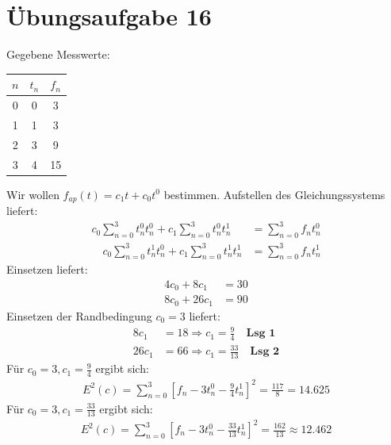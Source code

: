     \section*{Übungsaufgabe 16}
    Gegebene Messwerte: \\
    \begin{center}
    \begin{tabular}{|c|c|c|}
        \hline 
        $n$ & $t_n$ & $f_n$ \\
        \hline
        0   &  0    & 3 \\
        1   &  1    & 3 \\
        2   &  3    & 9 \\
        3   &  4    & 15 \\
        \hline
    \end{tabular}
    \end{center}
    Wir wollen $f_{ap}(t) = c_1 t + c_0 t^0$ bestimmen. Aufstellen des Gleichungssystems liefert:
    \begin{align*}
        c_0 \sum_{n=0}^{3} t_n^0 t_n^0 + c_1 \sum_{n=0}^3 t_n^0 t_n^1 &= \sum_{n=0}^3 f_n t_n^0 \\
        \quad c_0 \sum_{n=0}^{3} t_n^1 t_n^0 + c_1 \sum_{n=0}^3 t_n^1 t_n^1 &= \sum_{n=0}^3 f_n t_n^1
    \end{align*}
    Einsetzen liefert:
    \begin{align*}
        4c_0 + 8c_1 &= 30 \\
        8c_0 + 26c_1 &= 90
    \end{align*}
    Einsetzen der Randbedingung $c_0 = 3$ liefert:
    \begin{align*}
        8c_1 &= 18  \Rightarrow c_1 = \frac{9}{4} \quad \textbf{Lsg 1} \\
        26c_1 &= 66 \Rightarrow c_1 = \frac{33}{13} \quad \textbf{Lsg 2}
    \end{align*}
    Für $c_0 = 3, c_1 = \frac{9}{4}$ ergibt sich:
    \begin{align*}
        E^2(c) = \sum_{n=0}^3 \left[ f_n - 3t_n^0 - \frac{9}{4}t_n^1 \right]^2 = \frac{117}{8} = 14.625
    \end{align*}
    Für $c_0 = 3, c_1 = \frac{33}{13}$ ergibt sich:
    \begin{align*}
        E^2(c) = \sum_{n=0}^3 \left[ f_n - 3t_n^0 - \frac{33}{13}t_n^1 \right]^2 = \frac{162}{13} \approx 12.462 
    \end{align*}
